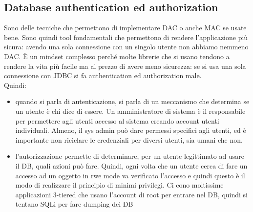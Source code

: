 \documentclass[12pt, oneside]{extbook} %
\begin{document}
\subsection{Database authentication ed authorization}
Sono delle tecniche che permettono di implementare DAC o anche MAC se usate bene. Sono quindi tool fondamentali che permettono di rendere l'applicazione più sicura: avendo una sola connessione con un singolo utente non abbiamo nemmeno DAC. È un mindset complesso perché molte librerie che si usano tendono a rendere la vita più facile ma al prezzo di avere meno sicurezza: se si usa una sola connessione con JDBC si fa authentication ed authorization male.\\Quindi:
\begin{itemize}
	\item quando si parla di autenticazione, si parla di un meccanismo che determina se un utente è chi dice di essere. Un amministratore di sistema è il responsabile per permettere agli utenti accesso al sistema creando account utenti individuali. Almeno, il sys admin può dare permessi specifici agli utenti, ed è importante non riciclare le credenziali per diversi utenti, sia umani che non.
	\item l'autorizzazione permette di determinare, per un utente legittimato ad usare il DB, quali azioni può fare. Quindi, ogni volta che un utente cerca di fare un accesso ad un oggetto in rwe mode va verificato l'accesso e quindi questo è il modo di realizzare il principio di minimi privilegi. Ci cono moltissime applicazioni 3-tiered che usano l'account di root per entrare nel DB, quindi si tentano SQLi per fare dumping dei DB
\end{itemize}
\end{document}
